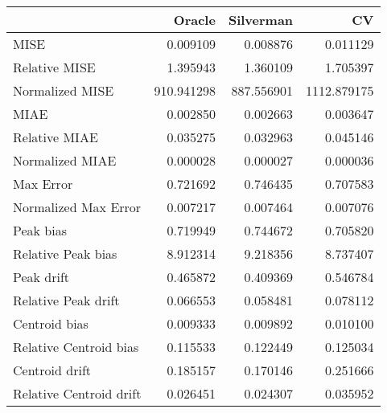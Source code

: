 \begin{tabular}{lrrr}
  \hline
 & Oracle & Silverman & CV \\ 
  \hline
MISE & 0.009109 & 0.008876 & 0.011129 \\ 
  Relative MISE & 1.395943 & 1.360109 & 1.705397 \\ 
  Normalized MISE & 910.941298 & 887.556901 & 1112.879175 \\ 
  MIAE & 0.002850 & 0.002663 & 0.003647 \\ 
  Relative MIAE & 0.035275 & 0.032963 & 0.045146 \\ 
  Normalized MIAE & 0.000028 & 0.000027 & 0.000036 \\ 
  Max Error & 0.721692 & 0.746435 & 0.707583 \\ 
  Normalized Max Error & 0.007217 & 0.007464 & 0.007076 \\ 
  Peak bias & 0.719949 & 0.744672 & 0.705820 \\ 
  Relative Peak bias & 8.912314 & 9.218356 & 8.737407 \\ 
  Peak drift & 0.465872 & 0.409369 & 0.546784 \\ 
  Relative Peak drift & 0.066553 & 0.058481 & 0.078112 \\ 
  Centroid bias & 0.009333 & 0.009892 & 0.010100 \\ 
  Relative Centroid bias & 0.115533 & 0.122449 & 0.125034 \\ 
  Centroid drift & 0.185157 & 0.170146 & 0.251666 \\ 
  Relative Centroid drift & 0.026451 & 0.024307 & 0.035952 \\ 
   \hline
\end{tabular}
